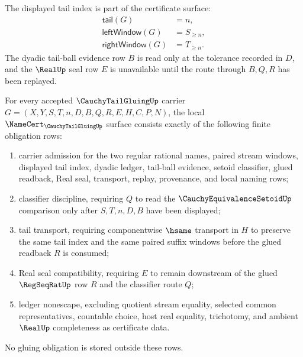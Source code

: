 The displayed tail index is part of the certificate surface:
$$
\begin{aligned}
\mathsf{tail}(G) &= n,\\
\mathsf{leftWindow}(G) &= S_{\geq n},\\
\mathsf{rightWindow}(G) &= T_{\geq n}.
\end{aligned}
$$
The dyadic tail-ball evidence row $B$ is read only at the tolerance recorded in $D$, and the $\RealUp$ seal row $E$ is unavailable until the route through $B,Q,R$ has been replayed.

\begin{theorem}\label{thm:cauchy-tail-gluing-namecert-obligations}
For every accepted $\CauchyTailGluingUp$ carrier $G=(X,Y,S,T,n,D,B,Q,R,E,H,C,P,N)$, the local $\NameCert_{\CauchyTailGluingUp}$ surface consists exactly of the following finite obligation rows:
\begin{enumerate}
\item carrier admission for the two regular rational names, paired stream windows, displayed tail index, dyadic ledger, tail-ball evidence, setoid classifier, glued readback, Real seal, transport, replay, provenance, and local naming rows;
\item classifier discipline, requiring $Q$ to read the $\CauchyEquivalenceSetoidUp$ comparison only after $S,T,n,D,B$ have been displayed;
\item tail transport, requiring componentwise $\hsame$ transport in $H$ to preserve the same tail index and the same paired suffix windows before the glued readback $R$ is consumed;
\item Real seal compatibility, requiring $E$ to remain downstream of the glued $\RegSeqRatUp$ row $R$ and the classifier route $Q$;
\item ledger nonescape, excluding quotient stream equality, selected common representatives, countable choice, host real equality, trichotomy, and ambient $\RealUp$ completeness as certificate data.
\end{enumerate}
No gluing obligation is stored outside these rows.
\end{theorem}
